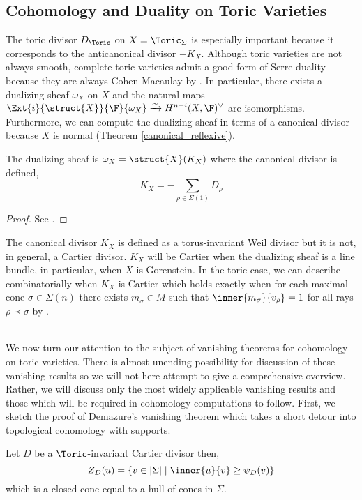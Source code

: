 \subsection{Cohomology and Duality on Toric Varieties} 

The toric divisor $D_\Toric$ on $X = \Toric_\Sigma$ is especially important because it corresponds to the anticanonical divisor $-K_X$. Although toric varieties are not always smooth, complete toric varieties admit a good form of Serre duality because they are always Cohen-Macaulay by \cite[Thm 9.2.9]{cox}. In particular, there exists a dualizing sheaf $\omega_X$ on $X$ and the natural maps $\Ext{i}{\struct{X}}{\F}{\omega_X} \xrightarrow{\sim} H^{n-i}(X, \F)^\vee$ are isomorphisms. Furthermore, we can compute the dualizing sheaf in terms of a canonical divisor because $X$ is normal (Theorem \ref{canonical_reflexive}).

\begin{lemma}
The dualizing sheaf is $\omega_X = \struct{X}(K_X)$ where the canonical divisor is defined,
\[ K_X =  - \sum_{\rho \in \Sigma(1)} D_\rho \]
\end{lemma}

\begin{proof}
See \cite[Thm. 8.2.3]{cox}.
\end{proof}

\begin{rmk}
The canonical divisor $K_X$ is defined as a torus-invariant Weil divisor but it is not, in general, a Cartier divisor. $K_X$ will be Cartier when the dualizing sheaf is a line bundle, in particular, when $X$ is Gorenstein. In the toric case, we can describe combinatorially when $K_X$ is Cartier which holds exactly when for each maximal cone $\sigma \in \Sigma(n)$ there exists $m_\sigma \in M$ such that $\inner{m_\sigma}{v_\rho} = 1$ for all rays $\rho \prec \sigma$ by \cite[Prop. 8.2.12]{cox}. 
\end{rmk}
\noindent\\
We now turn our attention to the subject of vanishing theorems for cohomology on toric varieties. There is almost unending possibility for discussion of these vanishing results so we will not here attempt to give a comprehensive overview. Rather, we will discuss only the most widely applicable vanishing results and those which will be required in cohomology computations to follow. First, we sketch the proof of Demazure's vanishing theorem which takes a short detour into topological cohomology with supports.


\begin{definition}
Let $D$ be a $\Toric$-invariant Cartier divisor then,
\[ Z_D(u) = \{ v \in |\Sigma| \mid \inner{u}{v} \ge \psi_D(v) \} \]
which is a closed cone equal to a hull of cones in $\Sigma$. 
\end{definition}

